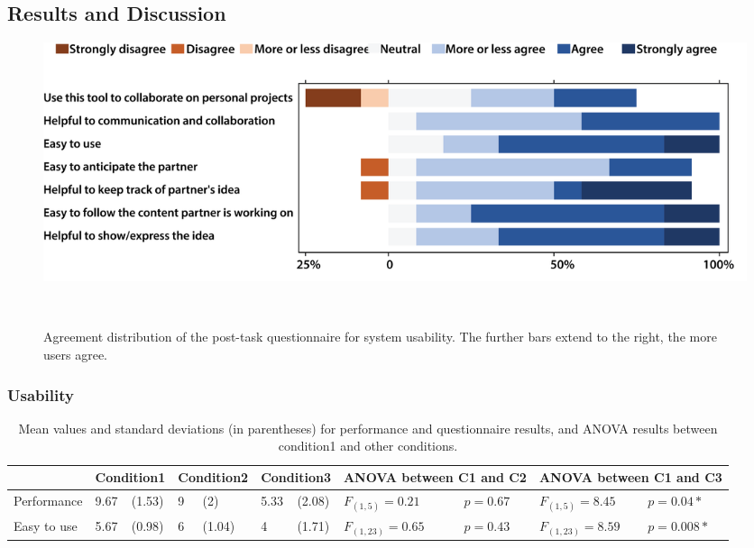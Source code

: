 \documentclass{sigchi}
\begin{document}
\subsection{Results and Discussion} 
\begin{figure}[tb!]
 \centering
 \includegraphics[width=0.98\columnwidth]{usability.png}
 \caption{Agreement distribution of the post-task questionnaire for system usability. The further bars extend to the right, the more users agree.
 }~\label{fig:usability}
\end{figure}
\subsubsection{Usability}

\begin{table}
  \centering
  \begin{tabular}{l l l l l l l l l l l}
    & \multicolumn{2}{c}{Condition1} & \multicolumn{2}{c}{Condition2} & \multicolumn{2}{c}{Condition3} & \multicolumn{2}{c}{ANOVA between C1 and C2} & \multicolumn{2}{c}{ANOVA between C1 and C3} \\
    \midrule
    Performance & 9.67 & (1.53) & 9 & (2) & 5.33 & (2.08) & $F_{(1,5)} = 0.21$ & $p = 0.67$ & $F_{(1,5)} =8.45$ & $p = 0.04*$\\
    Easy to use & 5.67 & (0.98) & 6 & (1.04) & 4 & (1.71) & $F_{(1,23)}=0.65$ & $p=0.43$ & $F_{(1,23)}=8.59$ & $p=0.008*$\\
  \end{tabular}
  \caption{Mean values and standard deviations (in parentheses) for performance and questionnaire results, and ANOVA results between condition1 and other conditions.}~\label{tab:result}
\end{table}
\end{document}
